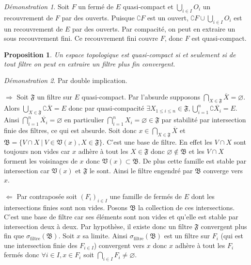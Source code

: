 \documentclass[a4paper, 11pt, french]{book}
\newenvironment{itemise}{\itemize}{\enditemize}
\theoremstyle{plain} %
\newtheorem{proposition}{Proposition}
\theoremstyle{definition} %
\theoremstyle{remark} %
\newtheorem*{demonstration}{Démonstration}
\newcommand{\1}{\mathds{1}}
\newcommand\vide{\varnothing}
\newcommand{\infegal}{\leqslant}
\newcommand\ens[2]{\{#1 \ |\ #2\}}
\begin{document}
\begin{demonstration}
	Soit $F$ un fermé de $E$ quasi-compact et $\bigcup_{i\in I}O_i$ un recouvrement de $F$ par des ouverts.
	Puisque $\complement F$ est un ouvert, $\complement F\cup\bigcup_{i\in I}O_i$ est un recouvrement de $E$ par des ouverts.
	Par compacité, on peut en extraire un sous recouvrement fini.
	Ce recouvrement fini couvre $F$, donc $F$ est quasi-compact.
\end{demonstration}

\begin{proposition}
	Un espace topologique est quasi-compact si et seulement si de tout filtre on peut en extraire un filtre plus fin convergent.
\end{proposition}

\begin{demonstration}
	Par double implication.
	\begin{itemise}
		\item[$\Rightarrow$] Soit $\mathfrak{F}$ un filtre sur $E$ quasi-compact.
		Par l'absurde supposons $\bigcap_{X\in\mathfrak{F}}\overline{X}=\vide$.
		Alors $\bigcup_{X\in\mathfrak{F}}\complement\overline{X}=E$ donc par quasi-compacité $\exists X_{1\infegal i\infegal n}\in\mathfrak{F}, \bigcup_{i=1}^n\complement\overline{X_i}=E$.
		Ainsi $\bigcap_{i=1}^n\overline{X_i}=\vide$ en particulier $\bigcap_{i=1}^nX_i=\vide\in\mathfrak{F}$ par stabilité par intersection finie des filtres, ce qui est absurde.
		Soit donc $x\in\bigcap_{X\in\mathfrak{F}}\overline{X}$ et $\mathfrak{B}=\ens{V\cap X}{V\in\mathfrak{V}(x), X\in\mathfrak{F}}$.
		C'est une base de filtre.
		En effet les $V\cap X$ sont toujours non vides car $x$ adhère à tout les $X\in\mathfrak{F}$ donc $\vide\notin\mathfrak{B}$ et les $V\cap X$ forment les voisinages de $x$ donc $\mathfrak{V}(x)\subset\mathfrak{B}$.
		De plus cette famille est stable par intersection car $\mathfrak{V}(x)$ et $\mathfrak{F}$ le sont.
		Ainsi le filtre engendré par $\mathfrak{B}$ converge vers $x$.
		\item[$\Leftarrow$] Par contraposée soit $(F_i)_{i\in I}$ une famille de fermés de $E$ dont les intersections finies sont non vides.
		Posons $\mathfrak{B}$ la collection de ces intersections.
		C'est une base de filtre car ses éléments sont non vides et qu'elle est stable par intersection deux à deux.
		Par hypothèse, il existe donc un filtre $\mathfrak{F}$ convergent plus fin que $\sigma_\text{filtre}(\mathfrak{B})$.
		Soit $x$ sa limite.
		Ainsi $\sigma_\text{filtre}(\mathfrak{B})$ est un filtre sur $F_i$ (qui est une intersection finie des $F_{i\in I}$) convergent vers $x$ donc $x$ adhère à tout les $F_i$ fermés donc $\forall i\in I, x\in F_i$ soit $\bigcap_{i\in I}F_i\neq\vide$.
	\end{itemise}
\end{demonstration}
\end{document}
